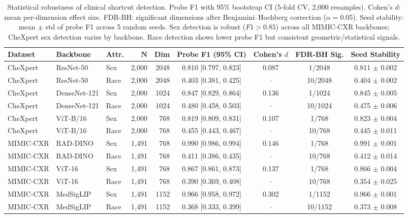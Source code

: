 \begin{table}[ht]
\centering
\scriptsize
\renewcommand{\arraystretch}{1.15}
\caption{Statistical robustness of clinical shortcut detection. Probe F1 with 95\% bootstrap CI (5-fold CV, 2{,}000 resamples). Cohen's $d$: mean per-dimension effect size. FDR-BH: significant dimensions after Benjamini--Hochberg correction ($\alpha{=}0.05$). Seed stability: mean $\pm$ std of probe F1 across 5 random seeds. Sex detection is robust ($F1 > 0.85$) across all MIMIC-CXR backbones; CheXpert sex detection varies by backbone. Race detection shows lower probe F1 but consistent geometric/statistical signals.}
\label{tab:robustness}
\begin{tabular}{ll l r r c c c c}
\hline
\textbf{Dataset} & \textbf{Backbone} & \textbf{Attr.} & $\mathbf{N}$ & \textbf{Dim} & \textbf{Probe F1 (95\% CI)} & \textbf{Cohen's $d$} & \textbf{FDR-BH Sig.} & \textbf{Seed Stability} \\
\hline
CheXpert & ResNet-50 & Sex & 2,000 & 2048 & 0.810 [0.797, 0.823] & 0.087 & 1/2048 & 0.811 $\pm$ 0.002 \\
CheXpert & ResNet-50 & Race & 2,000 & 2048 & 0.403 [0.381, 0.425] & $\cdot$ & 10/2048 & 0.404 $\pm$ 0.002 \\
\hline
CheXpert & DenseNet-121 & Sex & 2,000 & 1024 & 0.847 [0.829, 0.864] & 0.136 & 1/1024 & 0.845 $\pm$ 0.005 \\
CheXpert & DenseNet-121 & Race & 2,000 & 1024 & 0.480 [0.458, 0.503] & $\cdot$ & 10/1024 & 0.475 $\pm$ 0.006 \\
\hline
CheXpert & ViT-B/16 & Sex & 2,000 & 768 & 0.819 [0.809, 0.831] & 0.107 & 1/768 & 0.823 $\pm$ 0.004 \\
CheXpert & ViT-B/16 & Race & 2,000 & 768 & 0.455 [0.443, 0.467] & $\cdot$ & 10/768 & 0.445 $\pm$ 0.011 \\
\hline
MIMIC-CXR & RAD-DINO & Sex & 1,491 & 768 & 0.990 [0.986, 0.994] & 0.146 & 1/768 & 0.991 $\pm$ 0.001 \\
MIMIC-CXR & RAD-DINO & Race & 1,491 & 768 & 0.411 [0.386, 0.435] & $\cdot$ & 10/768 & 0.412 $\pm$ 0.014 \\
MIMIC-CXR & ViT-16 & Sex & 1,491 & 768 & 0.867 [0.861, 0.873] & 0.137 & 1/768 & 0.866 $\pm$ 0.004 \\
MIMIC-CXR & ViT-16 & Race & 1,491 & 768 & 0.390 [0.369, 0.408] & $\cdot$ & 10/768 & 0.354 $\pm$ 0.025 \\
MIMIC-CXR & MedSigLIP & Sex & 1,491 & 1152 & 0.966 [0.958, 0.972] & 0.302 & 1/1152 & 0.966 $\pm$ 0.001 \\
MIMIC-CXR & MedSigLIP & Race & 1,491 & 1152 & 0.368 [0.333, 0.399] & $\cdot$ & 10/1152 & 0.373 $\pm$ 0.008 \\
\hline
\end{tabular}
\end{table}